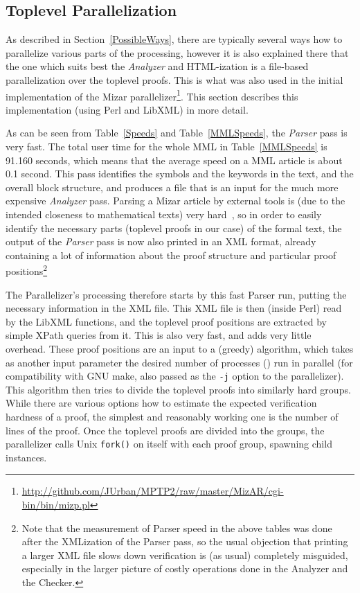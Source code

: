 \documentclass{llncs}
\begin{document}
\subsection{Toplevel Parallelization}
As described in Section~\ref{PossibleWays}, there are typically
several ways how to parallelize various parts of the processing,
however it is also explained there that the one which suits best the
\emph{Analyzer} and HTML-ization is a file-based parallelization over
the toplevel proofs. This is what was also used in the initial
implementation of the Mizar
parallelizer\footnote{\url{http://github.com/JUrban/MPTP2/raw/master/MizAR/cgi-bin/bin/mizp.pl}}. This
section describes this implementation (using Perl and LibXML) in more
detail.

As can be seen from Table~\ref{Speeds} and Table~\ref{MMLSpeeds}, the
\emph{Parser} pass is very fast. The total user time for the whole MML
in Table~\ref{MMLSpeeds} is 91.160 seconds, which means that the
average speed on a MML article is about 0.1 second. This pass
identifies the symbols and the keywords in the text, and the overall
block structure, and produces a file that is an input for the much
more expensive \emph{Analyzer} pass. Parsing a Mizar article by
external tools is (due to the intended closeness to mathematical
texts) very hard~\cite{CairnsG04}, so in order to easily identify the
necessary parts (toplevel proofs in our case) of the formal text, the
output of the \emph{Parser} pass is now also printed in an XML format,
already containing a lot of information about the proof structure and
particular proof positions\footnote{Note that the measurement of
  Parser speed in the above tables was done after the XMLization of
  the Parser pass, so the usual objection that printing a larger XML
  file slows down verification is (as usual) completely misguided,
  especially in the larger picture of costly operations done in the
  Analyzer and the Checker.}

The Parallelizer's processing therefore starts by this fast Parser
run, putting the necessary information in the XML file.  This XML file
is then (inside Perl) read by the LibXML functions, and the toplevel
proof positions are extracted by simple XPath queries from it. This is
also very fast, and adds very little overhead.  These proof positions
are an input to a (greedy) algorithm, which takes as another input
parameter the desired number of processes () run in parallel (for
compatibility with GNU make, also passed as the {\tt -j} option to the
parallelizer). This algorithm then tries to divide the toplevel proofs
into  similarly hard groups. While there are various options how to
estimate the expected verification hardness of a proof, the simplest
and reasonably working one is the number of lines of the proof. Once
the toplevel proofs are divided into the  groups, the parallelizer
calls Unix {\tt fork()} on itself with each proof group, spawning 
child instances.
\end{document}
